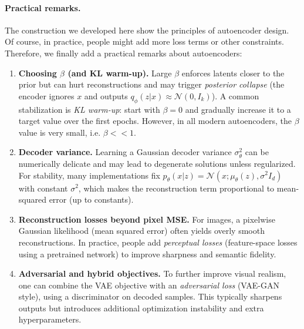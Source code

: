 \paragraph{Practical remarks.} The construction we developed here show the principles of autoencoder design. Of course, in practice, people might add more loss terms or other constraints. Therefore, we finally add a practical remarks about autoencoders:
\begin{enumerate}
\item \textbf{Choosing $\beta$ (and KL warm-up).}
Large $\beta$ enforces latents closer to the prior but can hurt reconstructions and may trigger \emph{posterior collapse} (the encoder ignores $x$ and outputs $q_\phi(z|x)\approx \mathcal{N}(0,I_k)$).
A common stabilization is \emph{KL warm-up}: start with $\beta=0$ and gradually increase it to a target value over the first epochs. However, in all modern autoencoders, the $\beta$ value is very small, i.e. $\beta<<1$.
\item \textbf{Decoder variance.}
Learning a Gaussian decoder variance $\sigma_\theta^2$ can be numerically delicate and may lead to degenerate solutions unless regularized.
For stability, many implementations fix $p_\theta(x|z)=\mathcal{N}(x;\mu_\theta(z),\sigma^2 I_d)$ with constant $\sigma^2$, which makes the reconstruction term proportional to mean-squared error (up to constants).
\item \textbf{Reconstruction losses beyond pixel MSE.}
For images, a pixelwise Gaussian likelihood (mean squared error) often yields overly smooth reconstructions.
In practice, people add \emph{perceptual losses} (feature-space losses using a pretrained network) to improve sharpness and semantic fidelity.
\item \textbf{Adversarial and hybrid objectives.}
To further improve visual realism, one can combine the VAE objective with an \emph{adversarial loss} (VAE-GAN style), using a discriminator on decoded samples.
This typically sharpens outputs but introduces additional optimization instability and extra hyperparameters.
\end{enumerate}



